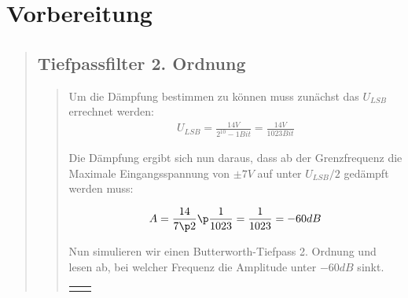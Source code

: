 \section{Vorbereitung}
\begin{quote}
    
    \subsection{Tiefpassfilter 2. Ordnung}
    \begin{quote}
        
        Um die Dämpfung bestimmen zu können muss zunächst das $U_{LSB}$ errechnet werden:
        \begin{equation}
    	\begin{split}
    		U_{LSB} = \frac{14V}{2^{10} - 1 Bit} = \frac{14V}{1023 Bit}
    	\end{split}
        \end{equation}
        
        Die Dämpfung ergibt sich nun daraus, dass ab der Grenzfrequenz die Maximale Eingangsspannung von $\pm 7V$ auf unter
        $U_{LSB}/2$ gedämpft werden muss:
        
        
        \begin{equation}
    	\begin{split}
    		A = \frac{14}{7 \p 2} \p \frac{1}{1023} = \frac{1}{1023} = -60 dB
    	\end{split}
        \end{equation}
        
        
        Nun simulieren wir einen Butterworth-Tiefpass 2. Ordnung und lesen ab, bei welcher Frequenz die Amplitude unter $-60 dB$
        sinkt.
        
        \begin{center}
        \vspace{-1.5cm}
        \begin{tabular}{ll}
        
        \hspace{-4.5cm}
            \begin{minipage}{0.6\textwidth}
                

\end{minipage}
\end{tabular}
\end{center}
\end{quote}
\end{quote}
